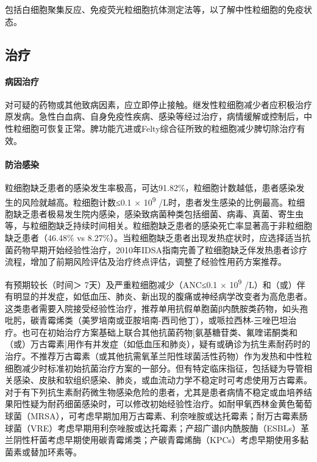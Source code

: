 包括白细胞聚集反应、免疫荧光粒细胞抗体测定法等，以了解中性粒细胞的免疫状态。

\subsection{治疗}

\paragraph{病因治疗}

对可疑的药物或其他致病因素，应立即停止接触。继发性粒细胞减少者应积极治疗原发病。急性白血病、自身免疫性疾病、感染等经过治疗，病情缓解或控制后，中性粒细胞可恢复正常。脾功能亢进或Felty综合征所致的粒细胞减少脾切除治疗有效。

\paragraph{防治感染}

粒细胞缺乏患者的感染发生率极高，可达91.82\%，粒细胞计数越低，患者感染发生的风险就越高。粒细胞计数≤0.1
× 10\textsuperscript{9}
/L时，患者发生感染的比例最高。粒细胞缺乏患者极易发生院内感染，感染致病菌种类包括细菌、病毒、真菌、寄生虫等，与粒细胞缺乏持续时间相关。粒细胞缺乏患者的感染死亡率显著高于非粒细胞缺乏患者（46.48\%
vs
8.27\%）。当粒细胞缺乏患者出现发热症状时，应选择适当抗菌药物早期开始经验性治疗，2010年IDSA指南完善了粒细胞缺乏伴发热患者诊疗流程，增加了前期风险评估及治疗终点评估，调整了经验性用药方案推荐。

有预期较长（时间＞ 7天）及严重粒细胞减少（ANC≤0.1 ×
10\textsuperscript{9}
/L）和（或）伴有明显的并发症，如低血压、肺炎、新出现的腹痛或神经病学改变者为高危患者。这类患者需要入院接受经验性治疗，推荐单用抗假单胞菌β内酰胺类药物，如头孢吡肟，碳青霉烯类（美罗培南或亚胺培南-西司他丁），或哌拉西林-三唑巴坦治疗。也可在初始治疗方案基础上联合其他抗菌药物{[}氨基糖苷类、氟喹诺酮类和（或）万古霉素{]}用作有并发症（如低血压和肺炎），疑有或确诊为抗生素耐药时的治疗。不推荐万古霉素（或其他抗需氧革兰阳性球菌活性药物）作为发热和中性粒细胞减少时标准初始抗菌治疗方案的一部分。但有特定临床指征，包括疑为导管相关感染、皮肤和软组织感染、肺炎，或血流动力学不稳定时可考虑使用万古霉素。对于有下列抗生素耐药微生物感染危险的患者，尤其是患者病情不稳定或血培养结果阳性疑为耐药细菌感染时，可以修改初始经验性治疗。如耐甲氧西林金黄色葡萄球菌（MRSA），可考虑早期加用万古霉素、利奈唑胺或达托霉素；耐万古霉素肠球菌（VRE）考虑早期用利奈唑胺或达托霉素；产超广谱β内酰胺酶（ESBLs）革兰阴性杆菌考虑早期使用碳青霉烯类；产碳青霉烯酶（KPCs）考虑早期使用多黏菌素或替加环素等。

